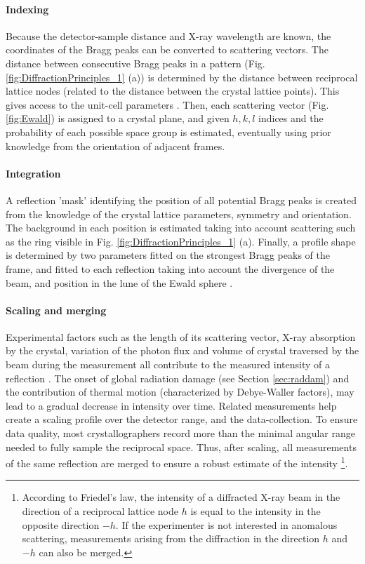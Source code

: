 \paragraph{Indexing} Because the detector-sample distance and X-ray wavelength are known, the coordinates of the Bragg peaks can be converted to scattering vectors. The distance between consecutive Bragg peaks in a pattern (Fig. \ref{fig:DiffractionPrinciples_1} (a)) is determined by the distance between reciprocal lattice nodes (related to the distance between the crystal lattice points). This gives access to the unit-cell parameters \parencite{kabschAutomaticIndexingRotation1988}. Then, each scattering vector (Fig. \ref{fig:Ewald}) is assigned to a crystal plane, and given \(h,k,l\) indices and the probability of each possible space group is estimated, eventually using prior knowledge from the orientation of adjacent frames.  

\paragraph{Integration} A reflection 'mask' identifying the position of all potential Bragg peaks is created from the knowledge of the crystal lattice parameters, symmetry and orientation. The background in each position is estimated taking into account scattering such as the ring visible in Fig. \ref{fig:DiffractionPrinciples_1} (a). Finally, a profile shape is determined by two parameters fitted on the strongest Bragg peaks of the frame, and fitted to each reflection taking into account the divergence of the beam, and position in the lune of the Ewald sphere \parencite{kabschXDS2010}. 

\paragraph{Scaling and merging} Experimental factors such as the length of its scattering vector, X-ray absorption by the crystal, variation of the photon flux and volume of crystal traversed by the beam during the measurement all contribute to the measured intensity of a reflection \parencite{evansHowGoodAre2013}. The onset of global radiation damage (see Section \ref{sec:raddam}) and the contribution of thermal motion (characterized by Debye-Waller factors), may lead to a gradual decrease in intensity over time. Related measurements help create a scaling profile over the detector range, and the data-collection. To ensure data quality, most crystallographers record more than the minimal angular range needed to fully sample the reciprocal space. Thus, after scaling, all measurements of the same reflection are merged to ensure a robust estimate of the intensity \footnote{According to Friedel's law, the intensity of a diffracted X-ray beam in the direction of a reciprocal lattice node \(h\) is equal to the intensity in the opposite direction \(-h\). If the experimenter is not interested in anomalous scattering, measurements arising from the diffraction in the direction \(h\) and \(-h\) can also be merged.}. 

